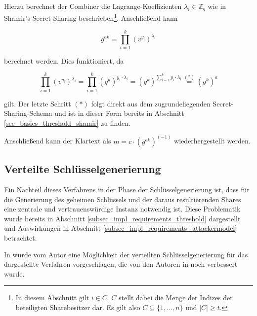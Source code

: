 Hierzu berechnet der Combiner die Lagrange-Koeffizienten \(\lambda_i \in \mathbb{Z}_q\) wie in Shamir's Secret Sharing beschrieben\footnote{
  In diesem Abschnitt gilt \(i \in C\). \(C\) stellt dabei die Menge der Indizes der beteiligten Sharebesitzer dar. Es gilt also \(C \subseteq \{1, \dots, n\}\) und \(| C | \ge t\).
}. Anschließend kann
 
\[g^{ak} = \prod_{i=1}^k (v^{y_i})^{\lambda_i}\]

berechnet werden. Dies funktioniert, da 

\[
\prod_{i=1}^k (v^{y_i})^{\lambda_i} = 
\prod_{i=1}^k (g^k)^{y_i \cdot \lambda_i} = 
(g^k)^{\sum_{i=1}^{k} y_i \cdot \lambda_i} \overset{(*)}{=}
(g^k)^a
\]

gilt. Der letzte Schritt \((*)\) folgt direkt aus dem zugrundeliegenden Secret-Sharing-Schema und ist in dieser Form bereits in Abschnitt \ref{sec_basics_threshold_shamir} zu finden.

Anschließend kann der Klartext als \(m = c \cdot (g^{ak})^{(-1)}\) wiederhergestellt werden. 

\subsection{Verteilte Schlüsselgenerierung}

\label{sec_state_threshold_distributed}

Ein Nachteil dieses Verfahrens in der Phase der Schlüsselgenerierung ist, dass für die Generierung des geheimen Schlüssels und der daraus resultierenden Shares eine zentrale und vertrauenswürdige Instanz notwendig ist. Diese Problematik wurde bereits in Abschnitt \ref{subsec_impl_requirements_threshold} dargestellt und Auswirkungen in Abschnitt \ref{subsec_impl_requirements_attackermodel} betrachtet.

In \cite{pedersen1991} wurde vom Autor eine Möglichkeit der verteilten Schlüsselgenerierung für das dargestellte Verfahren vorgeschlagen, die von den Autoren in \cite{gennaro1999} noch verbessert wurde. 


